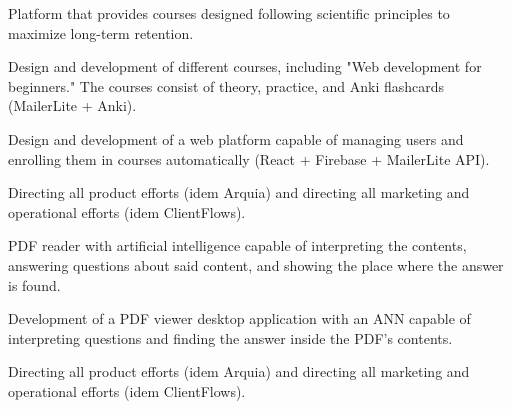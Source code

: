 \documentclass[]{deedy-resume-openfont}
\begin{document}
\begin{minipage}[t]{0.50\textwidth}
Platform that provides courses designed following scientific principles to maximize long-term retention.
\begin{tightemize}
\item Design and development of different courses, including "Web development for beginners." The courses consist of theory, practice, and Anki flashcards (MailerLite + Anki).
\item Design and development of a web platform capable of managing users and enrolling them in courses automatically (React + Firebase + MailerLite API).
\item Directing all product efforts (idem Arquia) and directing all marketing and operational efforts (idem ClientFlows).
\end{tightemize}
\sectionsep


PDF reader with artificial intelligence capable of interpreting the contents, answering questions about said content, and showing the place where the answer is found.
\begin{tightemize}
\item Development of a PDF viewer desktop application with an ANN capable of interpreting questions and finding the answer inside the PDF's contents.
\item Directing all product efforts (idem Arquia) and directing all marketing and operational efforts (idem ClientFlows).
\end{tightemize}
\sectionsep


\end{minipage} 
\end{document}
